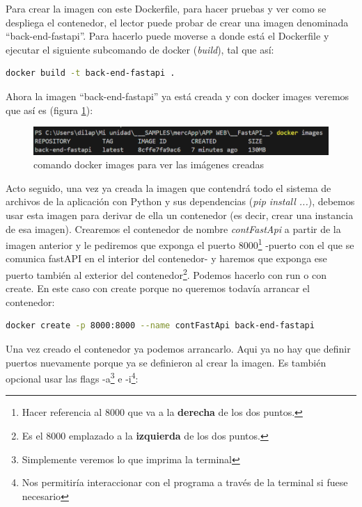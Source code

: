 \documentclass[a4paper,12pt]{report}
\begin{document}
	Para crear la imagen con este Dockerfile, para hacer pruebas y ver como se despliega el contenedor, el lector puede probar de crear una imagen denominada ``back-end-fastapi''. Para hacerlo puede moverse a donde está el Dockerfile y ejecutar el siguiente subcomando de docker (\textit{build}), tal que así:
	
	\begin{lstlisting}[language=bash]
		docker build -t back-end-fastapi .
	\end{lstlisting}
	
		Ahora la imagen ``back-end-fastapi'' ya está creada y con docker images veremos que así es (figura \ref{fig:dockerimages}):
	\FloatBarrier
	\begin{figure}[H]
		\centering
		\caption{comando docker images para ver las imágenes creadas}
		\label{fig:dockerimages}
		\includegraphics[width=1\linewidth]{img/dockerImages}
	\end{figure}
	\FloatBarrier
	

	
	Acto seguido, una vez ya creada la imagen que contendrá todo el sistema de archivos de la aplicación con Python y sus dependencias (\textit{pip install ...}), debemos usar esta imagen para derivar de ella un contenedor (es decir, crear una instancia de esa imagen). Crearemos el contenedor de nombre \textit{contFastApi} a partir de la imagen anterior y le pediremos que exponga el puerto 8000\footnote{Hacer referencia al 8000 que va a la \textbf{derecha} de los dos puntos.} -puerto con el que se comunica fastAPI en el interior del contenedor- y haremos que exponga ese puerto también al exterior del contenedor\footnote{Es el 8000 emplazado a la \textbf{izquierda} de los dos puntos.}. Podemos hacerlo con run o con create. En este caso con create porque no queremos todavía arrancar el contenedor:
	
	\begin{lstlisting}[language=bash]
docker create -p 8000:8000 --name contFastApi back-end-fastapi
	\end{lstlisting}

	
	Una vez creado el contenedor ya podemos arrancarlo. Aqui ya no hay que definir puertos nuevamente porque ya se definieron al crear la imagen. Es también opcional usar las flags -a\footnote{Simplemente veremos lo que imprima la terminal} e -i\footnote{Nos permitiría interaccionar con el programa a través de la terminal si fuese necesario}:
	
\end{document}
